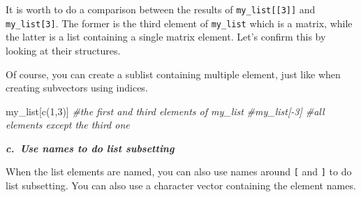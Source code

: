 \documentclass[
]{book}
\newenvironment{Shaded}{\begin{snugshade}}{\end{snugshade}}
\newcommand{\CommentTok}[1]{\textcolor[rgb]{0.56,0.35,0.01}{\textit{#1}}}
\newcommand{\DecValTok}[1]{\textcolor[rgb]{0.00,0.00,0.81}{#1}}
\newcommand{\FunctionTok}[1]{\textcolor[rgb]{0.00,0.00,0.00}{#1}}
\newcommand{\NormalTok}[1]{#1}
\newcommand{\StringTok}[1]{\textcolor[rgb]{0.31,0.60,0.02}{#1}}
\begin{document}
It is worth to do a comparison between the results of \texttt{my\_list{[}{[}3{]}{]}} and \texttt{my\_list{[}3{]}}. The former is the third element of \texttt{my\_list} which is a matrix, while the latter is a list containing a single matrix element. Let's confirm this by looking at their structures.

\begin{Shaded}
\end{Shaded}

Of course, you can create a sublist containing multiple element, just like when creating subvectors using indices.

\begin{Shaded}
\begin{Highlighting}[]
\NormalTok{my\_list[}\FunctionTok{c}\NormalTok{(}\DecValTok{1}\NormalTok{,}\DecValTok{3}\NormalTok{)] }\CommentTok{\#the first and third elements of my\_list}
\CommentTok{\#my\_list[{-}3]     \#all elements except the third one}
\end{Highlighting}
\end{Shaded}

\textbf{\emph{c.~Use names to do list subsetting}}

When the list elements are named, you can also use names around \texttt{{[}} and \texttt{{]}} to do list subsetting. You can also use a character vector containing the element names.

\begin{Shaded}
\end{Shaded}
\end{document}
